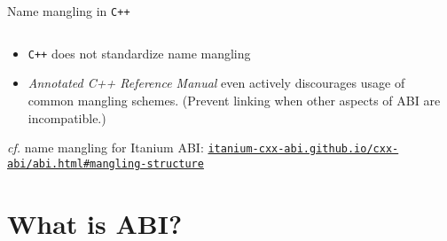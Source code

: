 \begin{frame}[fragile]{Name mangling in \texttt{C++}}
    \begin{columns}[t]
        \begin{column}{.45\textwidth}
        \end{column}
        \begin{column}{.45\textwidth}
        \end{column}
    \end{columns}

    \begin{itemize}
        \item \texttt{C++} does not standardize name mangling
        \item \textit{Annotated C++ Reference Manual} even actively discourages usage of common mangling schemes. (Prevent linking when other aspects of ABI are incompatible.) 
    \end{itemize}

    \centering
    \footnotesize \textit{cf.} name mangling for Itanium ABI: \href{https://itanium-cxx-abi.github.io/cxx-abi/abi.html#mangling-structure}{\texttt{itanium-cxx-abi.github.io/cxx-abi/abi.html\#mangling-structure}}
\end{frame}

\section{What is ABI?}

\begin{frame}
    \centering
    \scalebox{3}{What is ABI?}
\end{frame}

